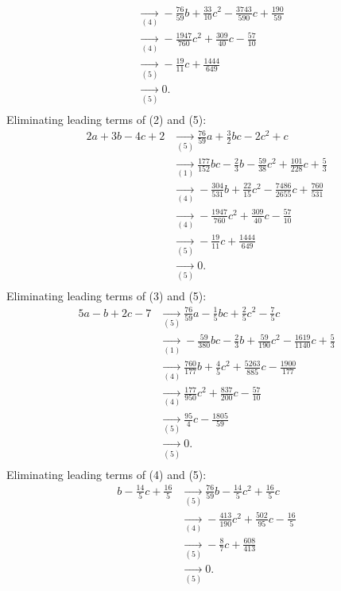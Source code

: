 {\begin{align*}
\\ &\underset{(4)}{\rightarrow}-\frac{76}{59}b+\frac{33}{10}c^{2}-\frac{3743}{590}c+\frac{190}{59}
\\ &\underset{(4)}{\rightarrow}-\frac{1947}{760}c^{2}+\frac{309}{40}c-\frac{57}{10}
\\ &\underset{(5)}{\rightarrow}-\frac{19}{11}c+\frac{1444}{649}
\\ &\underset{(5)}{\rightarrow}0
.\\ \end{align*}
Eliminating leading terms of (2) and (5):
\begin{align*}
2a+3b-4c+2&\underset{(5)}{\rightarrow}\frac{76}{59}a+\frac{3}{2}bc-2c^{2}+c
\\ &\underset{(1)}{\rightarrow}\frac{177}{152}bc-\frac{2}{3}b-\frac{59}{38}c^{2}+\frac{101}{228}c+\frac{5}{3}
\\ &\underset{(4)}{\rightarrow}-\frac{304}{531}b+\frac{22}{15}c^{2}-\frac{7486}{2655}c+\frac{760}{531}
\\ &\underset{(4)}{\rightarrow}-\frac{1947}{760}c^{2}+\frac{309}{40}c-\frac{57}{10}
\\ &\underset{(5)}{\rightarrow}-\frac{19}{11}c+\frac{1444}{649}
\\ &\underset{(5)}{\rightarrow}0
.\\ \end{align*}
Eliminating leading terms of (3) and (5):
\begin{align*}
5a-b+2c-7&\underset{(5)}{\rightarrow}\frac{76}{59}a-\frac{1}{5}bc+\frac{2}{5}c^{2}-\frac{7}{5}c
\\ &\underset{(1)}{\rightarrow}-\frac{59}{380}bc-\frac{2}{3}b+\frac{59}{190}c^{2}-\frac{1619}{1140}c+\frac{5}{3}
\\ &\underset{(4)}{\rightarrow}\frac{760}{177}b+\frac{4}{5}c^{2}+\frac{5263}{885}c-\frac{1900}{177}
\\ &\underset{(4)}{\rightarrow}\frac{177}{950}c^{2}+\frac{837}{200}c-\frac{57}{10}
\\ &\underset{(5)}{\rightarrow}\frac{95}{4}c-\frac{1805}{59}
\\ &\underset{(5)}{\rightarrow}0
.\\ \end{align*}
Eliminating leading terms of (4) and (5):
\begin{align*}
b-\frac{14}{5}c+\frac{16}{5}&\underset{(5)}{\rightarrow}\frac{76}{59}b-\frac{14}{5}c^{2}+\frac{16}{5}c
\\ &\underset{(4)}{\rightarrow}-\frac{413}{190}c^{2}+\frac{502}{95}c-\frac{16}{5}
\\ &\underset{(5)}{\rightarrow}-\frac{8}{7}c+\frac{608}{413}
\\ &\underset{(5)}{\rightarrow}0
.\\ \end{align*}
}